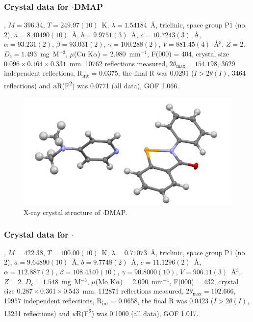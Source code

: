 \begin{refsection}
\subsubsection{Crystal data for \texorpdfstring{$ \cdot $DMAP}{C20 H19 N3 O Se}}
, $M=396.34$, $T=249.97(10)$~K, $\lambda=1.54184$~\AA, triclinic, space group P$\bar{1}$ (no. 2), $a = 8.40490(10)$~\AA, $b = 9.9751(3)$~\AA, $c = 10.7243(3)$~\AA, $\alpha = 93.231(2)$\degree, $\beta = 93.031(2)$\degree, $\gamma = 100.288(2)$\degree, $V = 881.45(4)$~\AA$^{3}$, $Z = 2$. $D_{c}= 1.493$~mg~M$^{-3}$, $\mu$(Cu K$\alpha$) = 2.980~mm$^{-1}$, F(000) = 404, crystal size $0.096 \times 0.164 \times 0.331$~mm. 10762 reflections measured, $2\theta_{\max}=154.198$\degree, 3629 independent reflections, R\textsubscript{int} = 0.0375, the final R was 0.0291 ($I > 2\theta(I)$, 3464 reflections) and \textit{w}R(F\textsuperscript{2}) was 0.0771 (all data), GOF 1.066.

\begin{figure}
  \includegraphics[width=0.6\linewidth]{Figures/ebs-dmap-xtal.pdf}
  \caption{X-ray crystal structure of \texorpdfstring{$ \cdot $DMAP}{C20 H19 N3 O Se}.}
\end{figure}

\subsubsection{Crystal data for \texorpdfstring{$ \cdot $}{C22 H21 N3 O Se}}
, $M=422.38$, $T=100.00(10)$~K, $ \lambda=0.71073 $~\AA, triclinic, space group P$\bar{1}$ (no. 2), $a = 9.64890(10)$~\AA, $b = 9.7748(2)$~\AA, $c = 11.1296(2)$~\AA, $\alpha = 112.887(2)$\degree, $\beta = 108.4340(10)$\degree, $\gamma = 90.8000(10)$\degree, $V = 906.11(3)$~\AA$^{3}$, $Z = 2$. $D_{c}= 1.548$~mg~M$^{-3}$, $\mu$(Mo K$\alpha$) = 2.090~mm$^{-1}$, F(000) = 432, crystal size $0.287 \times 0.361 \times 0.543$~mm. 112871 reflections measured, $2\theta_{\max}=102.666$\degree, 19957 independent reflections, R\textsubscript{int} = 0.0658, the final R was 0.0423 ($I > 2\theta(I)$, 13231 reflections) and \textit{w}R(F\textsuperscript{2}) was 0.1000 (all data), GOF 1.017.


\end{refsection}
